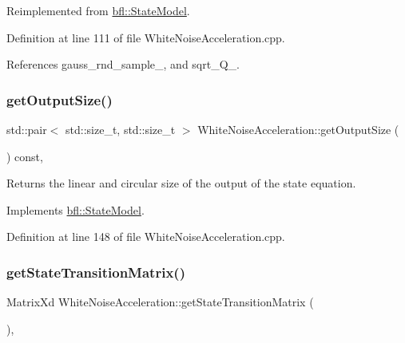Reimplemented from \mbox{\hyperlink{classbfl_1_1StateModel_acc6733af2dcba2a330bf7c59c3725e42}{bfl\+::\+State\+Model}}.



Definition at line 111 of file White\+Noise\+Acceleration.\+cpp.



References gauss\+\_\+rnd\+\_\+sample\+\_\+, and sqrt\+\_\+\+Q\+\_\+.

\mbox{\label{classbfl_1_1WhiteNoiseAcceleration_ac3e447bf2f520b543c67d066f72423b7}} 
\subsubsection{\texorpdfstring{get\+Output\+Size()}{getOutputSize()}}
{\footnotesize\ttfamily std\+::pair$<$ std\+::size\+\_\+t, std\+::size\+\_\+t $>$ White\+Noise\+Acceleration\+::get\+Output\+Size (\begin{DoxyParamCaption}{ }\end{DoxyParamCaption}) const\hspace{0.3cm}{\ttfamily [override]}, {\ttfamily [virtual]}}



Returns the linear and circular size of the output of the state equation. 



Implements \mbox{\hyperlink{classbfl_1_1StateModel_a6bf680b689389d959fc9ac46595e6dab}{bfl\+::\+State\+Model}}.



Definition at line 148 of file White\+Noise\+Acceleration.\+cpp.

\mbox{\label{classbfl_1_1WhiteNoiseAcceleration_aa304ad7f628e84c06393ba3835d2bb2f}} 
\subsubsection{\texorpdfstring{get\+State\+Transition\+Matrix()}{getStateTransitionMatrix()}}
{\footnotesize\ttfamily Matrix\+Xd White\+Noise\+Acceleration\+::get\+State\+Transition\+Matrix (\begin{DoxyParamCaption}{ }\end{DoxyParamCaption})\hspace{0.3cm}{\ttfamily [override]}, {\ttfamily [virtual]}}




